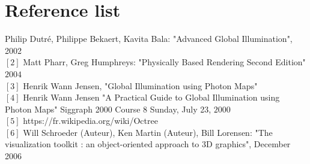 \documentclass[12pt]{article}
\numberwithin{equation}{section}
\begin{document}
\section{Reference list}
\noindent [1] Philip Dutr\'e, Philippe Bekaert, Kavita Bala: "Advanced Global Illumination", 2002\\
$[2]$ Matt Pharr, Greg Humphreys: "Physically Based Rendering Second Edition" $2004$\\
$[3]$ Henrik Wann Jensen, "Global Illumination using Photon Maps" \\
$[4]$ Henrik Wann Jensen "A Practical Guide to Global Illumination using Photon Maps" Siggraph 2000 Course 8 Sunday, July 23, $2000$\\
$[5]$ https://fr.wikipedia.org/wiki/Octree\\
$[6]$  Will Schroeder (Auteur), Ken Martin (Auteur), Bill Lorensen: "The visualization toolkit : an object-oriented approach to 3D graphics", December 2006\\



\nocite{*}


\end{document}
